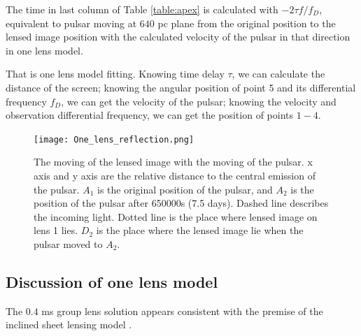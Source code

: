 \documentclass[useAMS,usenatbib]{mn2e}
\begin{document}
The time in last column of Table \ref{table:apex} is calculated with $-2{\tau}f/{f_{D}}$,
equivalent to pulsar moving at $640$ pc plane from the
original position to the lensed image position with the calculated velocity of the pulsar in that direction in one lens model.

That is one lens model fitting. Knowing time delay ${\tau}$, we can calculate the distance of the screen; knowing the angular position of point 5 and its differential frequency ${f_D}$, we can get the velocity of the pulsar; knowing the velocity and observation differential frequency, we can get the position of points $1-4$. %

\begin{figure}
\centering
\texttt{[image: One\_lens\_reflection.png]}
\caption{The moving of the lensed image with the moving of the pulsar. x axis and y axis are the relative distance to the central emission of the pulsar. $A_1$ is the original position of the pulsar, and $A_2$ is the position of the pulsar after 650000s (7.5 days). Dashed line describes the incoming light. Dotted line is the place where lensed image on lens 1 lies. $D_2$ is the place where the lensed image lie when the pulsar moved to $A_2$.}
\label{OneLensReflect}
\end{figure}



\subsection{Discussion of one lens model}

The $0.4$ ms group lens solution appears consistent with the premise of the inclined
sheet lensing model \citep{2014MNRAS.442.3338P}.
\end{document}
